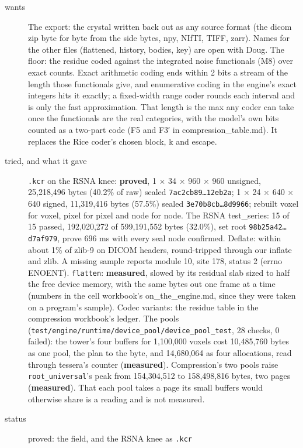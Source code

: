 \begin{description}
\item[{wants}] The export: the crystal written back out as any source format (the dicom zip byte for byte from the side bytes, npy, NIfTI, TIFF, zarr). Names for the other files (flattened, history, bodies, key) are open with Doug. The floor: the residue coded against the integrated noise functionals (M8) over exact counts. Exact arithmetic coding ends within 2 bits a stream of the length those functionals give, and enumerative coding in the engine's exact integers hits it exactly; a fixed-width range coder rounds each interval and is only the fast approximation. That length is the max any coder can take once the functionals are the real categories, with the model's own bits counted as a two-part code (F5 and F3′ in compression\_\allowbreak{}table.md). It replaces the Rice coder's chosen block, k and escape.
\item[{tried, and what it gave}] \texttt{.\allowbreak{}kcr} on the RSNA knee: \textbf{proved}, 1 × 34 × 960 × 960 unsigned, 25,218,496 bytes (40.2\% of raw) sealed \texttt{7ac2cb89…12eb2a}; 1 × 24 × 640 × 640 signed, 11,319,416 bytes (57.5\%) sealed \texttt{3e70b8cb…8d9966}; rebuilt voxel for voxel, pixel for pixel and node for node. The RSNA test\_\allowbreak{}series: 15 of 15 passed, 192,020,272 of 599,191,552 bytes (32.0\%), set root \texttt{98b25a42…d7af979}, prove 696 ms with every seal node confirmed. Deflate: within about 1\% of zlib-9 on DICOM headers, round-tripped through our inflate and zlib. A missing sample reports module 10, site 178, status 2 (errno ENOENT). \texttt{flatten}: \textbf{measured}, slowed by its residual slab sized to half the free device memory, with the same bytes out one frame at a time (numbers in the cell workbook's on\_\allowbreak{}the\_\allowbreak{}engine.md, since they were taken on a program's sample). Codec variants: the residue table in the compression workbook's ledger. The pools (\texttt{test/\allowbreak{}engine/\allowbreak{}runtime/\allowbreak{}device\_\allowbreak{}pool/\allowbreak{}device\_\allowbreak{}pool\_\allowbreak{}test}, 28 checks, 0 failed): the tower's four buffers for 1,100,000 voxels cost 10,485,760 bytes as one pool, the plan to the byte, and 14,680,064 as four allocations, read through tessera's counter (\textbf{measured}). Compression's two pools raise \texttt{root\_\allowbreak{}universal}'s peak from 154,304,512 to 158,498,816 bytes, two pages (\textbf{measured}). That each pool takes a page its small buffers would otherwise share is a reading and is not measured.
\item[{status}] proved: the field, and the RSNA knee as \texttt{.\allowbreak{}kcr}

\end{description}
